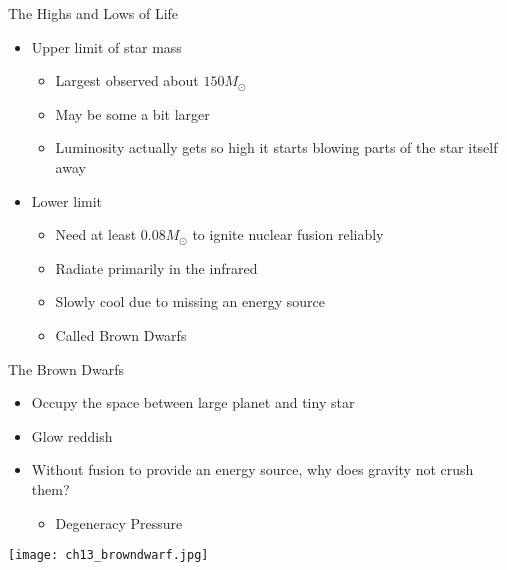 \documentclass[pdf,aspectratio=169]{beamer}
\begin{document}
\begin{frame}{The Highs and Lows of Life}
  \begin{itemize}
	\item Upper limit of star mass
	  \begin{itemize}
		\item Largest observed about $150 M_\odot$
		\item May be some a bit larger
		\item Luminosity actually gets so high it starts blowing parts of the star itself away
	  \end{itemize}
	\item Lower limit
	  \begin{itemize}
		\item Need at least $0.08 M_\odot$ to ignite nuclear fusion reliably
		\item Radiate primarily in the infrared
		\item Slowly cool due to missing an energy source
		\item Called Brown Dwarfs
	  \end{itemize}
  \end{itemize}
\end{frame}

\begin{frame}{The Brown Dwarfs}
  \begin{itemize}
	\item Occupy the space between large planet and tiny star
	\item Glow reddish
	\item Without fusion to provide an energy source, why does gravity not crush them?
	  \begin{itemize}
		\item Degeneracy Pressure
	  \end{itemize}
  \end{itemize}
  \begin{center}
	\texttt{[image: ch13\_browndwarf.jpg]}
  \end{center}
\end{frame}
\end{document}
